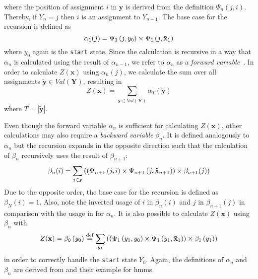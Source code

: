 where the position of assignment $i$ in $\mathbf{y}$ is derived from the definition $\Psi_n(j,i)$.
Thereby, if $Y_n=j$ then $i$ is an assignment to $Y_{n-1}$.
The base case for the recursion is defined as
\begin{equation}
  \label{equ:linear-chain-crf-z-alpha-base}
 \alpha_1(j) = \Psi_1\left(\vphantom{\tilde{x}}j,y_0\right)\times\Psi_1\left(j,\mathbf{\tilde{x}}_1\right)
\end{equation}
where $y_0$ again is the \texttt{start} state. Since the calculation is recursive in a way that $\alpha_n$ is calculated using the result of $\alpha_{n-1}$, we refer to $\alpha_n$ as a \textit{forward variable}~\citep{sutton2010introduction}. In order to calculate $Z(\mathbf{x})$ using $\alpha_n(j)$, we calculate the sum over all assignments $\mathbf{\tilde{y}}\in Val(\mathbf{Y})$, resulting in
\begin{equation}
  \label{equ:linear-chain-crf-z-alpha-sum}
  Z(\mathbf{x})=\sum_{\mathbf{\tilde{y}}\in Val(\mathbf{Y})}\alpha_T\left(\mathbf{\tilde{y}}\right)
\end{equation}
where $T=|\mathbf{\tilde{y}}|$.
\bigskip

Even though the forward variable $\alpha_n$ is sufficient for calculating $Z(\mathbf{x})$, other calculations may also require a \textit{backward variable} $\beta_n$. It is defined analogously to $\alpha_n$ but the recursion expands in the opposite direction such that the calculation of $\beta_n$ recursively uses the result of $\beta_{n+1}$:
\begin{equation}
  \label{equ:linear-chain-crf-z-beta}
  \beta_n(i) = \sum_{j\in\mathbf{y}}\left(\left(\Psi_{n+1}\left(\vphantom{\tilde{x}}j,i\right)\times\Psi_{n+1}\left(j,\mathbf{\tilde{x}}_{n+1}\right)\right)\times \beta_{n+1}(j)\right)
\end{equation}
Due to the opposite order, the base case for the recursion is defined as $\beta_N(i)=1$.
Also, note the inverted usage of $i$ in $\beta_n(i)$ and $j$ in $\beta_{n+1}(j)$ in comparison with the usage in  for $\alpha_n$.
It is also possible to calculate $Z(\mathbf{x})$ using $\beta_n$ with
\begin{equation}
  \label{equ:linear-chain-crf-z-beta-sum}
  Z(\mathbf{x})=\beta_0\left(y_0\right)\equalsdef\sum_{y_1}\left(\left(\Psi_1\left(\vphantom{\tilde{x}}y_1,y_0\right)\times\Psi_1\left(y_1,\mathbf{\tilde{x}}_1\right)\right)\times\beta_1\left(y_1\right)\right)
\end{equation}
in order to correctly handle the \texttt{start} state $Y_0$.
Again, the definitions of $\alpha_n$ and $\beta_n$ are derived from \citet{sutton2010introduction} and their example for \glspl{hmm}.

